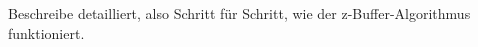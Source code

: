 \documentclass[../../main.tex]{subfiles}
\begin{document}
Beschreibe detailliert, also Schritt für Schritt, wie der z-Buffer-Algorithmus funktioniert.
\end{document}
